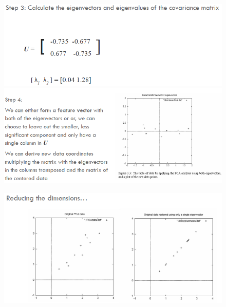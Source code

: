 		\begin{figure}
			\centering
			\begin{minipage}{.5\textwidth}
				\centering
				\includegraphics[width=1\linewidth]{imgs/chapter12/img7}
				\caption{}
				\label{fig:chapter12-07}
			\end{minipage}%
			\begin{minipage}{.5\textwidth}
				\centering
				\includegraphics[width=1\linewidth]{imgs/chapter12/img8}
				\caption{}
				\label{fig:chapter12-08}
			\end{minipage}
		\end{figure}
		
		\begin{figure}
			\centering
			\includegraphics[width=0.6\linewidth]{imgs/chapter12/img9}
			\caption{}
			\label{fig:chapter12-09}
		\end{figure}
		
